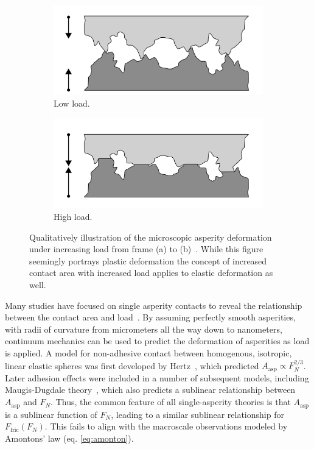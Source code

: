\begin{figure}[H]
  \centering
  \begin{subfigure}[b]{0.49\textwidth}
      \centering
      \includegraphics[width=\textwidth]{figures/theory/asperities_top.png}
      \caption{Low load.}
      \label{fig:asp_left}
  \end{subfigure}
  \hfill
  \begin{subfigure}[b]{0.49\textwidth}
      \centering
      \includegraphics[width=\textwidth]{figures/theory/asperities_bottom.png}
      \caption{High load.}
      \label{fig:asp_right}
  \end{subfigure}
  \hfill
     \caption{Qualitatively illustration of the microscopic asperity deformation
     under increasing load from frame (a) to (b)~\cite{wiki:asperities}. While this figure seemingly portrays plastic deformation the concept of increased contact area with increased load applies to elastic deformation as well.}
     \label{fig:asperity_contact}
\end{figure}

Many studies have focused on single asperity contacts to reveal the relationship
between the contact area and load~\cite{Szlufarska_2008, PhysRevLett.56.930,
perry_scanning_2004}. By assuming perfectly smooth asperities, with radii of
curvature from micrometers all the way down to nanometers, continuum mechanics
can be used to predict the deformation of asperities as load is applied. A model
for non-adhesive contact between homogenous, isotropic, linear elastic spheres
was first developed by Hertz~\cite{HertzOnTC}, which predicted $A_{\text{asp}}
\propto F_N^{2/3}$. Later adhesion effects were included in a number of
subsequent models, including Maugis-Dugdale theory~\cite{MAUGIS1992243}, which
also predicts a sublinear relationship between $A_{\text{asp}}$ and $F_N$. Thus,
the common feature of all single-asperity theories is that $A_{\text{asp}}$ is a
sublinear function of $F_N$, leading to a similar sublinear relationship for
$F_\text{fric}(F_N)$. This fails to align with the macroscale observations
modeled by Amontons’ law (eq. \eqref{eq:amonton}).

